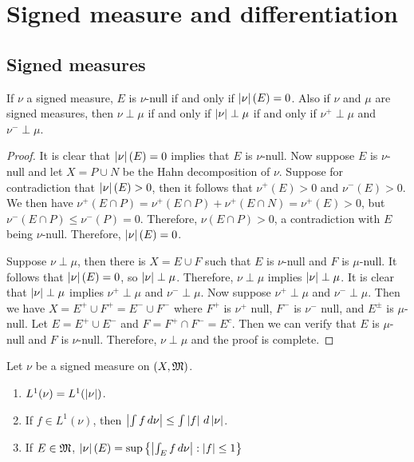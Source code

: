 \documentclass[a4paper]{article}
\begin{document}
\maketitle

\tableofcontents

\setcounter{section}{2}
\section{Signed measure and differentiation}

\subsection{Signed measures}

\begin{ex}[Folland 3.2]
If $\nu$ a signed measure, $E$ is $\nu$-null if and only if 
$\left\lvert \nu\right\rvert(E) = 0$. Also if $\nu$ and $\mu$ are signed measures,
then $\nu \perp \mu$ if and only if $\left\lvert \nu\right\rvert \perp \mu$ 
if and only if $\nu^+ \perp \mu$ and $\nu^- \perp \mu$.
\end{ex}

\begin{proof}
It is clear that $\left\lvert \nu\right\rvert(E) = 0$ implies that $E$ is $\nu$-null.
Now suppose $E$ is $\nu$-null and let $X = P \cup N$ be the 
Hahn decomposition of $\nu$. Suppose for contradiction 
that $\left\lvert \nu\right\rvert(E) > 0$, then it follows that 
$\nu^+(E) > 0$ and $\nu^- (E) > 0$. We then have 
$\nu^+(E \cap P) = \nu^+ (E \cap P) + \nu^+ (E \cap N) = \nu^+(E)
> 0$, but $\nu^- (E \cap P) \leq \nu^- (P) = 0$. Therefore, 
$\nu(E \cap P) > 0$, a contradiction with $E$ being $\nu$-null.
Therefore, $\left\lvert \nu\right\rvert(E) = 0$.

Suppose $\nu \perp \mu$, then there is $X = E \cup F$ such that 
$E$ is $\nu$-null and $F$ is $\mu$-null. It follows that 
$\left\lvert \nu\right\rvert(E) = 0$, so $\left\lvert \nu\right\rvert \perp \mu$. Therefore, 
$\nu \perp \mu$ implies $\left\lvert \nu\right\rvert \perp \mu$. It is clear 
that $\left\lvert \nu\right\rvert \perp \mu$ implies $\nu^+ \perp \mu$
and $\nu^- \perp \mu$. Now suppose 
$\nu^+ \perp \mu$ and $\nu^- \perp \mu$. Then we have 
$X = E^+ \cup F^+ = E^- \cup F^-$ where $F^+$ is $\nu^+$ null,
$F^-$ is $\nu^-$ null, and $E^\pm$ is $\mu$-null. Let 
$E = E^+ \cup E^-$ and $F = F^+ \cap F^- = E^c$. Then we can 
verify that $E$ is $\mu$-null and $F$ is $\nu$-null. Therefore, 
$\nu \perp \mu$ and the proof is complete.
\end{proof}

\begin{ex}[Folland 3.3]
Let $\nu$ be a signed measure on $(X, \mathfrak{M})$. 
\begin{enumerate}
  \item $L^1 (\nu) = L^1(\left\lvert \nu\right\rvert)$.
  \item If $f \in L^1 (\nu)$, then $\left\lvert \int f \, d \nu\right\rvert
  \leq \int \left\lvert f\right\rvert \, d \left\lvert \nu\right\rvert$.
  \item If $E \in \mathfrak{M}$, $\left\lvert \nu\right\rvert(E) = \sup 
  \left\{ \left\lvert \int_E f \, d \nu\right\rvert : \left\lvert f\right\rvert \leq 1 \right\}$
\end{enumerate}  
\end{ex}
\end{document}
